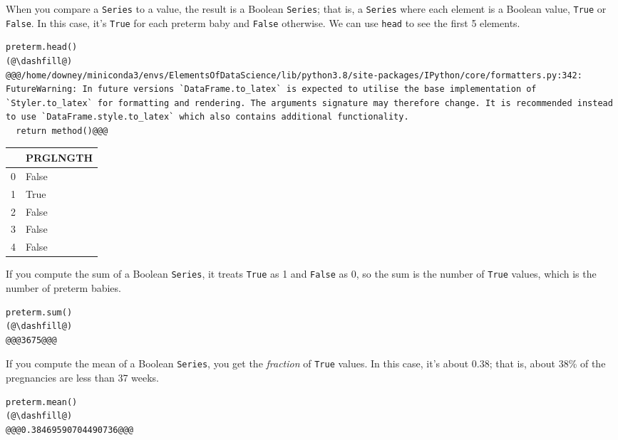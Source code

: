 When you compare a \passthrough{\lstinline!Series!} to a value, the
result is a Boolean \passthrough{\lstinline!Series!}; that is, a
\passthrough{\lstinline!Series!} where each element is a Boolean value,
\passthrough{\lstinline!True!} or \passthrough{\lstinline!False!}. In
this case, it's \passthrough{\lstinline!True!} for each preterm baby and
\passthrough{\lstinline!False!} otherwise. We can use
\passthrough{\lstinline!head!} to see the first 5 elements.

\begin{lstlisting}[]
preterm.head()
(@\dashfill@)
@@@/home/downey/miniconda3/envs/ElementsOfDataScience/lib/python3.8/site-packages/IPython/core/formatters.py:342: FutureWarning: In future versions `DataFrame.to_latex` is expected to utilise the base implementation of `Styler.to_latex` for formatting and rendering. The arguments signature may therefore change. It is recommended instead to use `DataFrame.style.to_latex` which also contains additional functionality.
  return method()@@@
\end{lstlisting}

\begin{tabular}{ll}
\midrule
{} &  PRGLNGTH \\
\midrule
0 &     False \\
1 &      True \\
2 &     False \\
3 &     False \\
4 &     False \\
\midrule
\end{tabular}

If you compute the sum of a Boolean \passthrough{\lstinline!Series!}, it
treats \passthrough{\lstinline!True!} as 1 and
\passthrough{\lstinline!False!} as 0, so the sum is the number of
\passthrough{\lstinline!True!} values, which is the number of preterm
babies.

\begin{lstlisting}[]
preterm.sum()
(@\dashfill@)
@@@3675@@@
\end{lstlisting}

If you compute the mean of a Boolean \passthrough{\lstinline!Series!},
you get the \emph{fraction} of \passthrough{\lstinline!True!} values. In
this case, it's about 0.38; that is, about 38\% of the pregnancies are
less than 37 weeks.

\begin{lstlisting}[]
preterm.mean()
(@\dashfill@)
@@@0.38469590704490736@@@
\end{lstlisting}

